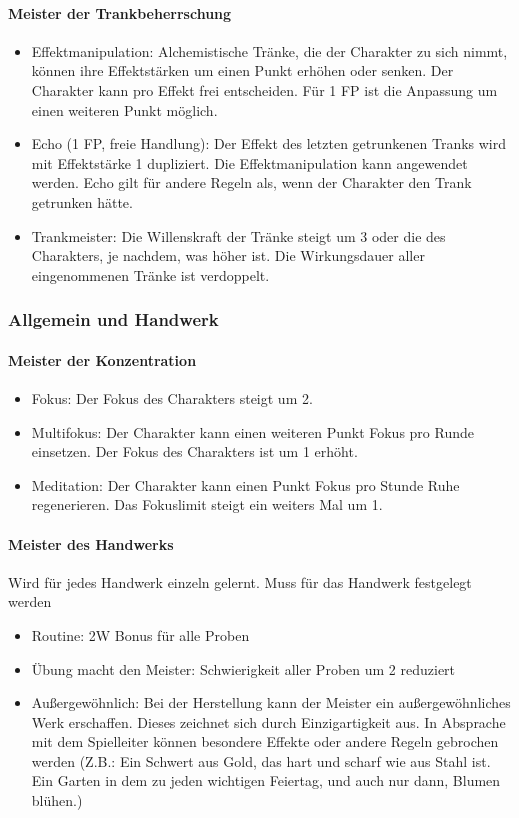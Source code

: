 \documentclass{article}
\begin{document}
\paragraph{Meister der Trankbeherrschung}

\begin{itemize}
\item Effektmanipulation: Alchemistische Tränke, die der Charakter zu sich nimmt, können ihre Effektstärken um einen Punkt erhöhen oder senken. Der Charakter kann pro Effekt frei entscheiden. Für 1 FP ist die Anpassung um einen weiteren Punkt möglich.
\item Echo (1 FP, freie Handlung): Der Effekt des letzten getrunkenen Tranks wird mit Effektstärke 1 dupliziert. Die Effektmanipulation kann angewendet werden. Echo gilt für andere Regeln als, wenn der Charakter den Trank getrunken hätte.
\item Trankmeister: Die Willenskraft der Tränke steigt um 3 oder die des Charakters, je nachdem, was höher ist. Die Wirkungsdauer aller eingenommenen Tränke ist verdoppelt.
\end{itemize}

\subsubsection{Allgemein und Handwerk}

\paragraph{Meister der Konzentration}

\begin{itemize}
\item Fokus: Der Fokus des Charakters steigt um 2.
\item Multifokus: Der Charakter kann einen weiteren Punkt Fokus pro Runde einsetzen. Der Fokus des Charakters ist um 1 erhöht.
\item Meditation: Der Charakter kann einen Punkt Fokus pro Stunde Ruhe regenerieren. Das Fokuslimit steigt ein weiters Mal um 1.
\end{itemize}

\paragraph{Meister des Handwerks}

Wird für jedes Handwerk einzeln gelernt. Muss für das Handwerk festgelegt werden

\begin{itemize}
\item Routine: 2W Bonus für alle Proben
\item Übung macht den Meister: Schwierigkeit aller Proben um 2 reduziert
\item Außergewöhnlich: Bei der Herstellung kann der Meister ein außergewöhnliches Werk erschaffen. Dieses zeichnet sich durch Einzigartigkeit aus. In Absprache mit dem Spielleiter können besondere Effekte oder andere Regeln gebrochen werden (Z.B.: Ein Schwert aus Gold, das hart und scharf wie aus Stahl ist. Ein Garten in dem zu jeden wichtigen Feiertag, und auch nur dann, Blumen blühen.)
\end{itemize}
\end{document}
